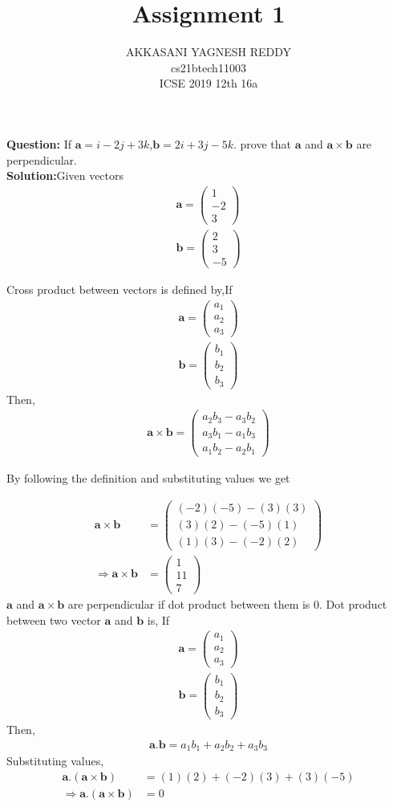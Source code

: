 \documentclass[journal,12pt,twocolumn]{IEEEtran}
\title{Assignment 1}
\author{AKKASANI YAGNESH REDDY \\
     cs21btech11003 \\
     ICSE 2019 12th 16a}
\let\vec\mathbf
\newcommand{\myvec}[1]{\ensuremath{\begin{pmatrix}#1\end{pmatrix}}}
\begin{document}
     \maketitle
\textbf{Question:} If $\vec{a}=i-2j+3k$,$\vec{b}=2i+3j-5k$. prove that $\vec{a}$ and $\vec{a}\times\vec{b}$ are perpendicular.\\
    
    \textbf{Solution:}Given vectors
    \begin{align}
        \vec{a}=\myvec{1\\-2\\3} \\
        \vec{b}=\myvec{2\\3\\-5}
    \end{align}
    
    Cross product between vectors is defined by,If
    \begin{align}
        \vec{a}=\myvec{a_{1}\\a_{2}\\a_{3}}\\
        \vec{b}=\myvec{b_{1}\\b_{2}\\b_{3}}
    \end{align}
        Then,
    \begin{align}
            \vec{a}\times\vec{b}=\myvec{a_{2}b_{3}-a_{3}b_{2}\\a_{3}b_{1}-a_{1}b_{3}\\a_{1}b_{2}-a_{2}b_{1}}
    \end{align}
      
      By following the definition and substituting values we get
      
      \begin{align}
          \vec{a}\times\vec{b}&=\myvec{(-2)(-5)-(3)(3)\\(3)(2)-(-5)(1)\\(1)(3)-(-2)(2)}\\ 
         \Rightarrow  \vec{a}\times\vec{b}&=\myvec{1\\11\\7}
           \end{align}
         $\vec{a}$ and  $\vec{a}\times\vec{b}$ are perpendicular if dot product between them is $0$.  
    Dot product between two vector $\vec{a}$ and $\vec{b}$ is, If
    \begin{align}
        \vec{a}=\myvec{a_{1}\\a_{2}\\a_{3}}\\
        \vec{b}=\myvec{b_{1}\\b_{2}\\b_{3}}
    \end{align}
    Then,
    \begin{align}
      \vec{a}.\vec{b}=a_{1}b_{1}+a_{2}b_{2}+a_{3}b_{3}
    \end{align}
          Substituting values,
          \begin{align}
              \vec{a}. (\vec{a}\times\vec{b})&=(1)(2)+(-2)(3)+(3)(-5)\\
              \Rightarrow\vec{a}. (\vec{a}\times\vec{b})&=0
          \end{align}
          
\end{document}
